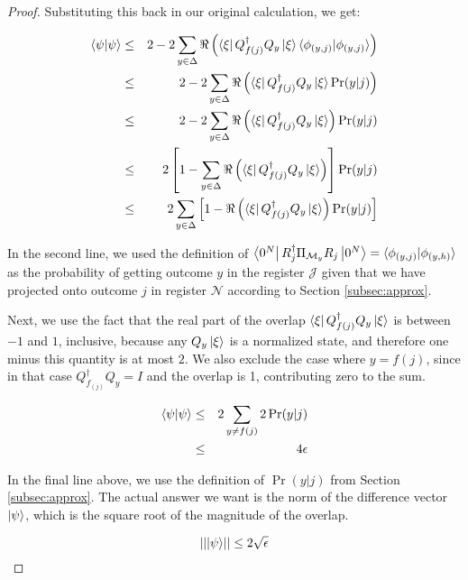 \begin{proof}
Substituting this
back in our original calculation, we get:

\begin{eqnarray}
\langle \psi|\psi \rangle & \le & 2 - 2\sum_{y \in \Delta} \Re\left(
  \left\langle{\xi}\right\vert Q_{f(j)}^{\dagger}Q_y \left\vert{\xi}\right\rangle
  \langle \phi_{(y,j)}|\phi_{(y,j)} \rangle \right) \\
   & \le & 2 - 2\sum_{y \in \Delta} \Re\left(
           \left\langle{\xi}\right\vert Q_{f(j)}^{\dagger}Q_y \left\vert{\xi}\right\rangle\Pr(y | j) \right) \\
   & \le & 2 - 2\sum_{y \in \Delta} \Re\left(
           \left\langle{\xi}\right\vert Q_{f(j)}^{\dagger}Q_y \left\vert{\xi}\right\rangle\right) \Pr(y | j) \\
   & \le & 2 \left[ 1 - \sum_{y \in \Delta} \Re\left(
           \left\langle{\xi}\right\vert Q_{f(j)}^{\dagger}Q_y \left\vert{\xi}\right\rangle \right) \right] \Pr(y | j) \\
   & \le & 2 \sum_{y \in \Delta}\left[
           1 - \Re\left( \left\langle{\xi}\right\vert Q_{f(j)}^{\dagger}Q_y \left\vert{\xi}\right\rangle \right)
           \Pr(y | j)
           \right]
\end{eqnarray}

In the second line, we used the definition of
$\left\langle{0^N}\right\vert R_j^{\dagger}\Pi_{\mathcal{M}_y}R_j\left\vert{0^N}\right\rangle = \langle \phi_{(y,j)}|\phi_{(y,h)} \rangle$
as the probability of getting outcome $y$ in the register
$\mathcal{J}$ given that we have projected onto outcome $j$ in register
$\mathcal{N}$ according to Section \ref{subsec:approx}.

Next, we use the fact that the real part of the overlap
$\left\langle{\xi}\right\vert Q_{f(j)}^{\dagger}Q_y \left\vert{\xi}\right\rangle$ is between $-1$ and $1$, inclusive,
because any $Q_y\left\vert{\xi}\right\rangle$ is a normalized state, and therefore one minus
this quantity is at most $2$. We also exclude the case where
$y = f(j)$, since in that case $Q_{f_(j)}^{\dagger}Q_y = I$ and the overlap
is 1, contributing zero to the sum.

\begin{eqnarray}
\langle \psi|\psi \rangle & \le & 2 \sum_{y \ne f(j)} 2\Pr(y|j) \label{eqn:prob-sum}\\
                    & \le & 4\epsilon
\end{eqnarray}

In the final line above, we use the definition of $\Pr(y|j)$ from
Section \ref{subsec:approx}. The actual answer we want is the norm
of the difference vector $\left\vert{\psi}\right\rangle$, which is the square root of the
magnitude of the overlap.

\begin{equation}
\lvert\lvert \left\vert{\psi}\right\rangle \rvert\rvert \le 2\sqrt{\epsilon}
\end{equation}


\end{proof}
